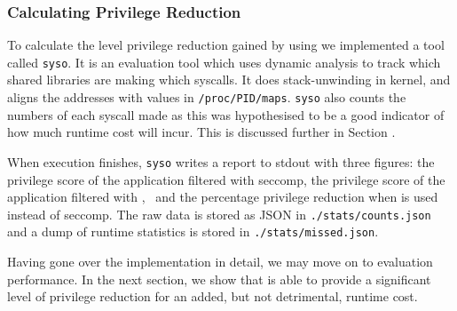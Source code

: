 \subsubsection{Calculating Privilege Reduction}

To calculate the level privilege reduction gained by using \af we implemented a
tool called \texttt{syso}. It is an evaluation tool which uses dynamic analysis
to track which shared libraries are making which syscalls. It does
stack-unwinding in kernel, and aligns the addresses with values in
\texttt{/proc/PID/maps}. \texttt{syso} also counts the numbers of each syscall 
made as this was hypothesised to be a good indicator of how much runtime cost
\af will incur. This is discussed further in Section .

When execution finishes, \texttt{syso} writes a report to \ac{stdout} with three
figures: the privilege score of the application filtered with seccomp, the
privilege score of the application filtered with \afss,~ and the percentage
privilege reduction when \af is used instead of seccomp. The raw data is stored
as JSON in \texttt{./stats/counts.json} and a dump of runtime statistics is
stored in \texttt{./stats/missed.json}.

Having gone over the implementation in detail, we may move on to evaluation
\afg performance. In the next section, we show that \af is able to provide a
significant level of privilege reduction for an added, but not detrimental,
runtime cost.
